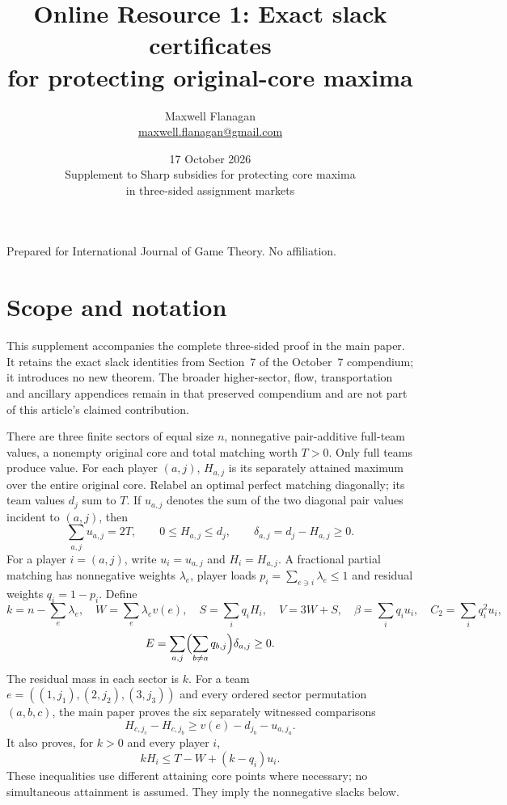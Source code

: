 \documentclass[11pt]{article}
\title{Online Resource 1: Exact slack certificates\\for protecting original-core maxima}
\author{Maxwell Flanagan\\\small\href{mailto:maxwell.flanagan@gmail.com}{maxwell.flanagan@gmail.com}}
\date{17 October 2026\\[2pt]\small Supplement to Sharp subsidies for protecting core maxima\\in three-sided assignment markets}
\theoremstyle{remark}
\begin{document}
\maketitle
\noindent Prepared for International Journal of Game Theory. No affiliation.

\section{Scope and notation}
This supplement accompanies the complete three-sided proof in the main paper.
It retains the exact slack identities from Section~7 of the October~7
compendium; it introduces no new theorem. The broader higher-sector, flow,
transportation and ancillary appendices remain in that preserved compendium
and are not part of this article's claimed contribution.

There are three finite sectors of equal size $n$, nonnegative pair-additive full-team
values, a nonempty original core and total matching worth $T>0$. Only full
teams produce value. For each player $(a,j)$, $H_{a,j}$ is its separately
attained maximum over the entire original core. Relabel an optimal perfect
matching diagonally; its team values $d_j$ sum to $T$. If $u_{a,j}$ denotes
the sum of the two diagonal pair values incident to $(a,j)$, then
\[
\sum_{a,j}u_{a,j}=2T,\qquad 0\le H_{a,j}\le d_j,
\qquad\delta_{a,j}=d_j-H_{a,j}\ge0.
\]
For a player $i=(a,j)$, write $u_i=u_{a,j}$ and $H_i=H_{a,j}$.
A fractional partial matching has nonnegative weights $\lambda_e$, player
loads $p_i=\sum_{e\ni i}\lambda_e\le1$ and residual weights $q_i=1-p_i$.
Define
\[
 k=n-\sum_e\lambda_e,\quad W=\sum_e\lambda_ev(e),\quad
 S=\sum_iq_iH_i,\quad V=3W+S,\quad
 \beta=\sum_iq_iu_i,\quad C_2=\sum_iq_i^2u_i,
\]
\[
 E=\sum_{a,j}\Bigl(\sum_{b\ne a}q_{b,j}\Bigr)\delta_{a,j}\ge0.
\]
The residual mass in each sector is $k$. For a team
$e=((1,j_1),(2,j_2),(3,j_3))$ and every ordered sector permutation $(a,b,c)$,
the main paper proves the six separately witnessed comparisons
\begin{equation}\label{eq:comparison}
 H_{c,j_c}-H_{c,j_b}\ge v(e)-d_{j_b}-u_{a,j_a}.
\end{equation}
It also proves, for $k>0$ and every player $i$,
\[
 kH_i\le T-W+(k-q_i)u_i.
\]
These inequalities use different attaining core points where necessary;
no simultaneous attainment is assumed. They imply the nonnegative slacks below.
\end{document}
